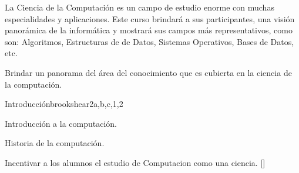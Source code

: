\begin{syllabus}


\begin{justification}
La Ciencia de la Computación es un campo de estudio enorme con muchas especialidades y aplicaciones. Este curso brindará a sus participantes, una visión panorámica de la informática y mostrará sus campos más representativos, como son: Algoritmos, Estructuras de de Datos, Sistemas Operativos, Bases de Datos, etc.
\end{justification}

\begin{goals}
\item Brindar un panorama del área del conocimiento que es cubierta en la ciencia de la computación.
\end{goals}


\begin{unit}{Introducción}{}{brookshear}{2}{a,b,c,1,2}
    \begin{topics}
	\item Introducción a la computación.
	\item Historia de la computación.
   \end{topics}
   \begin{learningoutcomes}
      \item Incentivar a los alumnos el estudio de Computacion como una ciencia. [\Familiarity]
   \end{learningoutcomes}
\end{unit}


\end{syllabus}
